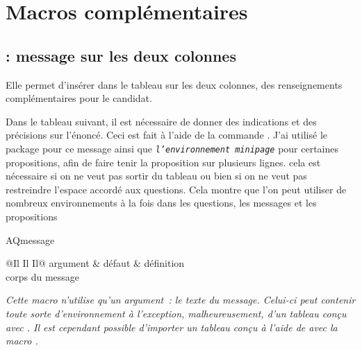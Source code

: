 
\section{Macros complémentaires}

\subsection{ : message sur les deux colonnes} 

Elle permet d'insérer dans le tableau sur les deux colonnes, des renseignements complémentaires pour le candidat. 

Dans le tableau suivant, il est nécessaire de donner des indications et des précisions sur l'énoncé. Ceci est fait à l'aide de la commande . J'ai utilisé le package  pour ce message ainsi que  \emph{\texttt{l'environnement minipage}} pour certaines propositions, afin de faire tenir la proposition sur plusieurs lignes. cela est nécessaire si on ne veut pas sortir du tableau ou bien si on ne veut pas restreindre l'espace accordé aux questions.
Cela montre que l'on peut utiliser de nombreux environnements à la fois dans les questions, les messages et les propositions

\begin{NewMacroBox}{AQmessage}{{}}

\begin{tabular}{@{}Il Il Il@{}}  \toprule \thead
argument                 & défaut           & définition     \\ \midrule
\tbody
{}  {}     {corps du message}      
\bottomrule
\end{tabular}

\medskip
\emph{Cette macro n'utilise qu'un argument~: le texte du message. Celui-ci peut contenir toute sorte d'environnement à l'exception, malheureusement, d'un tableau conçu avec . Il est cependant possible d'importer un tableau conçu à l'aide de  avec la macro \footnotemark.}
\end{NewMacroBox}


